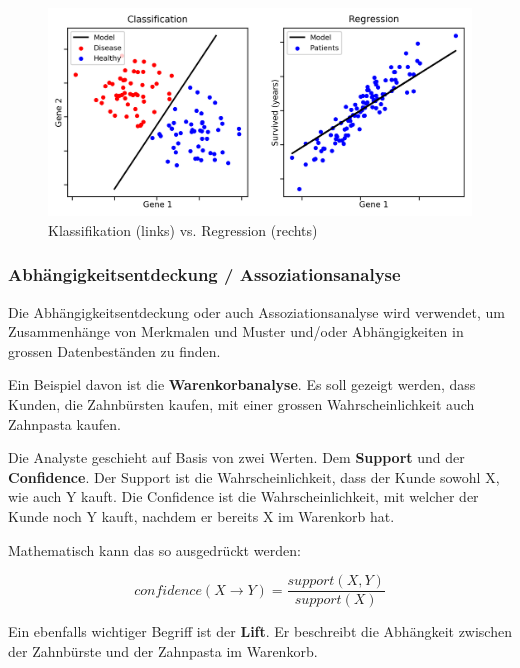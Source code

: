 \documentclass[a4paper, 11pt, nofootinbib]{article}
\begin{document}
 \begin{figure}[htb]
 	\centering
 	\includegraphics[keepaspectratio=true,height=15\baselineskip]{regressionvsclassification.png}
 	\caption{Klassifikation (links) vs. Regression (rechts)}
 	\label{fig:regclass}
 \end{figure}

\newpage

\subsubsection{Abhängigkeitsentdeckung / Assoziationsanalyse}
Die Abhängigkeitsentdeckung oder auch Assoziationsanalyse wird verwendet, um Zusammenhänge von Merkmalen und Muster und/oder Abhängigkeiten in grossen Datenbeständen zu finden. 

Ein Beispiel davon ist die \textbf{Warenkorbanalyse}. Es soll gezeigt werden, dass Kunden, die Zahnbürsten kaufen, mit einer grossen Wahrscheinlichkeit auch Zahnpasta kaufen.
\vspace{10px}

\noindent Die Analyste geschieht auf Basis von zwei Werten. Dem \textbf{Support} und der \textbf{Confidence}. Der Support ist die Wahrscheinlichkeit, dass der Kunde sowohl X, wie auch Y kauft. Die Confidence ist die Wahrscheinlichkeit, mit welcher der Kunde noch Y kauft, nachdem er bereits X im Warenkorb hat.
\vspace{10px}

\noindent Mathematisch kann das so ausgedrückt werden:

\begin{equation}
confidence({X} \rightarrow {Y}) = \dfrac{support({X, Y})}{support({X})}
\end{equation}

Ein ebenfalls wichtiger Begriff ist der \textbf{Lift}. Er beschreibt die Abhängkeit zwischen der Zahnbürste und der Zahnpasta im Warenkorb.
\end{document}
